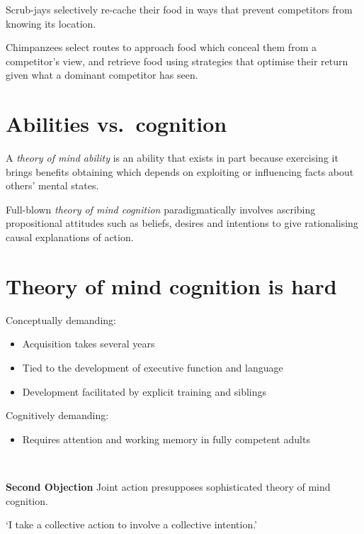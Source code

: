 \documentclass[11pt]{extarticle}
\begin{document}
\begin{multicols}{3}
Scrub-jays selectively re-cache their food in ways that prevent competitors from knowing its location.\citep{Clayton:2007fh}

Chimpanzees select routes to approach food which conceal them from a competitor’s view,\citep{Hare:2006ih} and retrieve food using strategies that optimise their return given what a dominant competitor has seen.\citep{Hare:2001ph}


\section{Abilities vs.\ cognition}

A \emph{theory of mind ability} is an ability that exists in part because exercising it brings benefits obtaining which depends on exploiting or influencing facts about others’ mental states.  

Full-blown \emph{theory of mind cognition} paradigmatically involves ascribing propositional attitudes such as beliefs, desires and intentions to give rationalising causal explanations of action. 



\section{Theory of mind cognition is hard}

Conceptually demanding:
\begin{itemize}\itemsep0pt
\item Acquisition takes several years\citep{Wimmer:1983dz,Wellman:2001lz}
\item Tied to the development of executive function\citep{Perner:1999yr,Sabbagh:2006ke} and language\citep{Astington2005ot}
\item Development facilitated by explicit training\citep{Slaughter:1996fv} and siblings\citep{Clements:2000nc,Hughes:2004zj}
\end{itemize}
%
Cognitively demanding: 
\begin{itemize}
\item Requires attention and working memory in fully competent adults\citep{Apperly:2008jv,McKinnon:2007rr}
\end{itemize}


\ 

{\Large
\textbf{Second Objection}
Joint action presupposes sophisticated theory of mind cognition.
}

`I take a collective action to involve a collective intention.'  \citep%
{Gilbert:2006wr}


\end{multicols}
\end{document}
